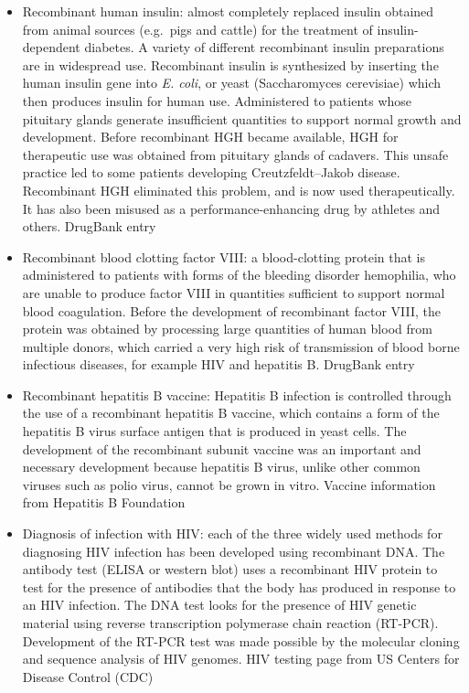 \begin{itemize}
\tightlist
\item
  Recombinant human insulin: almost completely replaced insulin obtained from animal sources (e.g.~pigs and cattle) for the treatment of insulin-dependent diabetes. A variety of different recombinant insulin preparations are in widespread use. Recombinant insulin is synthesized by inserting the human insulin gene into \emph{E. coli}, or yeast (Saccharomyces cerevisiae) which then produces insulin for human use. Administered to patients whose pituitary glands generate insufficient quantities to support normal growth and development. Before recombinant HGH became available, HGH for therapeutic use was obtained from pituitary glands of cadavers. This unsafe practice led to some patients developing Creutzfeldt--Jakob disease. Recombinant HGH eliminated this problem, and is now used therapeutically. It has also been misused as a performance-enhancing drug by athletes and others. DrugBank entry
\item
  Recombinant blood clotting factor VIII: a blood-clotting protein that is administered to patients with forms of the bleeding disorder hemophilia, who are unable to produce factor VIII in quantities sufficient to support normal blood coagulation. Before the development of recombinant factor VIII, the protein was obtained by processing large quantities of human blood from multiple donors, which carried a very high risk of transmission of blood borne infectious diseases, for example HIV and hepatitis B. DrugBank entry
\item
  Recombinant hepatitis B vaccine: Hepatitis B infection is controlled through the use of a recombinant hepatitis B vaccine, which contains a form of the hepatitis B virus surface antigen that is produced in yeast cells. The development of the recombinant subunit vaccine was an important and necessary development because hepatitis B virus, unlike other common viruses such as polio virus, cannot be grown in vitro. Vaccine information from Hepatitis B Foundation
\item
  Diagnosis of infection with HIV: each of the three widely used methods for diagnosing HIV infection has been developed using recombinant DNA. The antibody test (ELISA or western blot) uses a recombinant HIV protein to test for the presence of antibodies that the body has produced in response to an HIV infection. The DNA test looks for the presence of HIV genetic material using reverse transcription polymerase chain reaction (RT-PCR). Development of the RT-PCR test was made possible by the molecular cloning and sequence analysis of HIV genomes. HIV testing page from US Centers for Disease Control (CDC)

\end{itemize}
